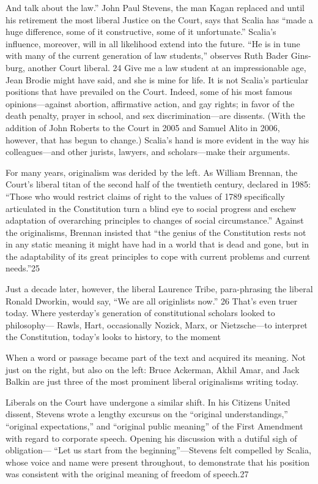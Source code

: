 And talk about the law.” John Paul Stevens, the man Kagan replaced and until his retirement the most liberal Justice on the Court, says that Scalia has “made a huge difference, some of it constructive, some of it unfortunate.” Scalia’s influence, moreover, will in all likelihood extend into the future. “He is in tune with many of the current generation of law students,” observes Ruth Bader Gins-burg, another Court liberal. {\color{blue}24} Give me a law student at an impressionable age, Jean Brodie might have said, and she is mine for life. It is not Scalia’s particular positions that have prevailed on the Court. Indeed, some of his most famous opinions—against abortion, affirmative action, and gay rights; in favor of the death penalty, prayer in school, and sex discrimination—are dissents. (With the addition of John Roberts to the Court in 2005 and Samuel Alito in 2006, however, that has begun to change.) Scalia’s hand is more evident in the way his colleagues—and other jurists, lawyers, and scholars—make their arguments.
 \par 
For many years, originalism was derided by the left. As William Brennan, the Court’s liberal titan of the second half of the twentieth century, declared in 1985: “Those who would restrict claims of right to the values of 1789 specifically articulated in the Constitution turn a blind eye to social progress and eschew adaptation of overarching principles to changes of social circumstance.” Against the originalisms, Brennan insisted that “the genius of the Constitution rests not in any static meaning it might have had in a world that is dead and gone, but in the adaptability of its great principles to cope with current problems and current needs.”{\color{blue}25}
 \par 
Just a decade later, however, the liberal Laurence Tribe, para-phrasing the liberal Ronald Dworkin, would say, “We are all originlists now.” {\color{blue}26} That’s even truer today. Where yesterday’s generation of constitutional scholars looked to philosophy— Rawls, Hart, occasionally Nozick, Marx, or Nietzsche—to interpret the Constitution, today’s looks to history, to the moment
 \par 
When a word or passage became part of the text and acquired its meaning. Not just on the right, but also on the left: Bruce Ackerman, Akhil Amar, and Jack Balkin are just three of the most prominent liberal originalisms writing today.
 \par 
Liberals on the Court have undergone a similar shift. In his Citizens United dissent, Stevens wrote a lengthy excursus on the “original understandings,” “original expectations,” and “original public meaning” of the First Amendment with regard to corporate speech. Opening his discussion with a dutiful sigh of obligation— “Let us start from the beginning”—Stevens felt compelled by Scalia, whose voice and name were present throughout, to demonstrate that his position was consistent with the original meaning of freedom of speech.{\color{blue}27}
